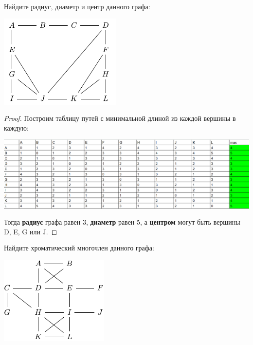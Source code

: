 \begin{problem}[10]

	Найдите радиус, диаметр и центр данного графа:
    
    \centering\includegraphics[width=0.4\linewidth]{pics/10thGraph.png}
    
\end{problem}

\begin{proof}
    Построим таблицу путей с минимальной длиной из каждой вершины в каждую:

     \centering\includegraphics[width=1.1\linewidth]{pics/10ThSolution.png}
    
    Тогда \textbf{радиус} графа равен 3, \textbf{диаметр} равен 5, а \textbf{центром} могут быть вершины D, E, G или J.

\end{proof}

\begin{problem}[11]

	Найдите хроматический многочлен данного графа:
    
    \centering\includegraphics[width=0.4\linewidth]{pics/11ThGraph.png}
    
\end{problem}

